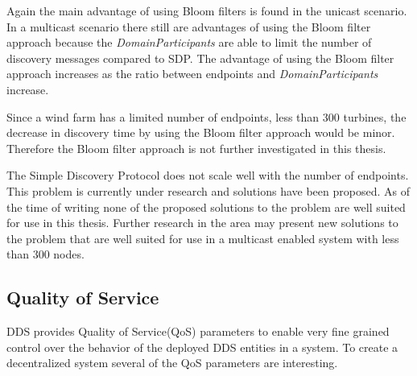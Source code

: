 Again the main advantage of using Bloom filters is found in the unicast scenario. In a multicast scenario there still are advantages of using the Bloom filter approach because the \textit{DomainParticipants} are able to limit the number of discovery messages compared to SDP. The advantage of using the Bloom filter approach increases as the ratio between endpoints and \textit{DomainParticipants} increase.

Since a wind farm has a limited number of endpoints, less than 300 turbines, the decrease in discovery time by using the Bloom filter approach would be minor. Therefore the Bloom filter approach is not further investigated in this thesis. \newline

The Simple Discovery Protocol does not scale well with the number of endpoints. This problem is currently under research and solutions have been proposed. As of the time of writing none of the proposed solutions to the problem are well suited for use in this thesis. Further research in the area may present new solutions to the problem that are well suited for use in a multicast enabled system with less than 300 nodes.

\subsection{Quality of Service}
DDS provides Quality of Service(QoS) parameters to enable very fine grained control over the behavior of the deployed DDS entities in a system. To create a decentralized system several of the QoS parameters are interesting.

